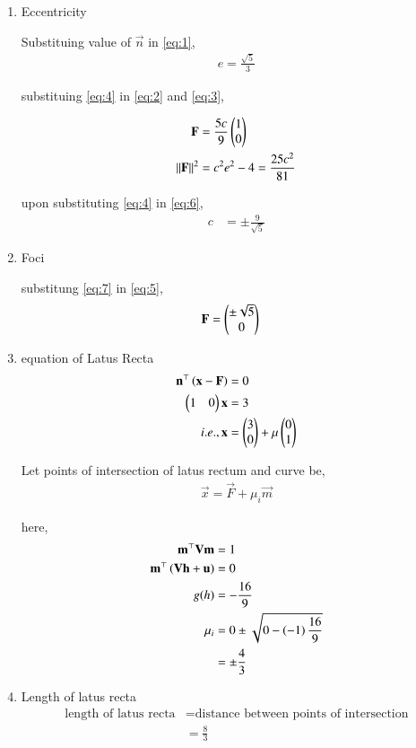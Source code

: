 \documentclass[journal,12pt,twocolumn]{IEEEtran}
\begin{document}
\begin{enumerate}
\item Eccentricity

Substituing value of $\vec{n}$ in \eqref{eq:1},
\begin{align}
	e = \frac{\sqrt{5}}{3} 	\label{eq:4}
\end{align}

substituing \eqref{eq:4} in \eqref{eq:2} and \eqref{eq:3},

\begin{align}
	\mathbf{F} &= \frac{5c}{9}\begin{pmatrix}1\\0\end{pmatrix} \label{eq:5} \\
	\left\lVert\mathbf{F}\right\rVert^2 &= c^2e^2 -4 = \frac{25c^2}{81}  \label{eq:6}
\end{align}

upon substituting \eqref{eq:4} in \eqref{eq:6},
\begin{align}
	c &= \pm \frac{9}{\sqrt{5}} \label{eq:7}
\end{align}

\item Foci

	substitung \eqref{eq:7} in \eqref{eq:5},
\begin{align}
	\mathbf{F} &= \begin{pmatrix} \pm \sqrt{5} \\0\end{pmatrix}
\end{align}

\item equation of Latus Recta
\begin{align}
	\mathbf{n}^{\top} \left(\mathbf{x} -\mathbf{F}\right) &= 0\\
	\begin{pmatrix} 1&0\end{pmatrix} \mathbf{x} &= 3\\
	i.e., \mathbf{x} &= \begin{pmatrix}3\\0\end{pmatrix} + \mu \begin{pmatrix}0\\1\end{pmatrix} 
\end{align}

Let points of intersection of latus rectum and curve be,
\begin{align}
	\vec{x} = \vec{F} + \mu_i \vec{m}
\end{align}


here,
\begin{align}
	\mathbf{m}^{\top}\mathbf{V}\mathbf{m} &= 1\\
	\mathbf{m}^{\top}\left(\mathbf{V}\mathbf{h}+\mathbf{u}\right) &= 0 \\
	g(h) &= -\frac{16}{9}\\
	{\mu}_i &= {0 \pm \sqrt{0 - \left(-1\right)\frac{16}{9}}}\\
		&= \pm \frac{4}{3}
\end{align}

\item Length of latus recta
\begin{align}
\text{length of latus recta} &= \text{distance between points of intersection}\\
&= \frac{8}{3}
\end{align}

\end{enumerate}
\end{document}
